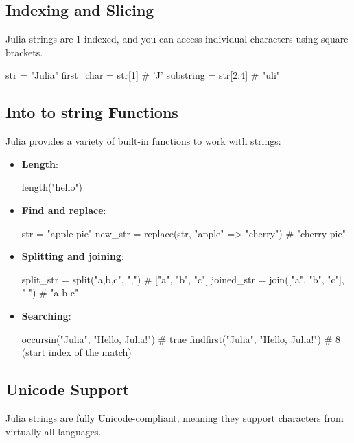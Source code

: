 \documentclass{report}
\begin{document}
    \subsection{Indexing and Slicing}
    \bigbreak \noindent 
    Julia strings are 1-indexed, and you can access individual characters using square brackets.
    \bigbreak \noindent 
    \begin{jlcode}
        str = "Julia"
        first_char = str[1]  # 'J'
        substring = str[2:4]  # "uli"
    \end{jlcode}


    \bigbreak \noindent 
    \subsection{Into to string Functions }
    \bigbreak \noindent 
    Julia provides a variety of built-in functions to work with strings:
    \begin{itemize}
        \item \textbf{Length}:
            \bigbreak \noindent 
            \begin{jlcode}
            length("hello")
            \end{jlcode}
        \item \textbf{Find and replace}:
            \bigbreak \noindent 
            \begin{jlcode}
                str = "apple pie"
                new_str = replace(str, "apple" => "cherry")  # "cherry pie"
            \end{jlcode}
        \item \textbf{Splitting and joining}:
            \bigbreak \noindent 
            \begin{jlcode}
                split_str = split("a,b,c", ",")  # ["a", "b", "c"]
                joined_str = join(["a", "b", "c"], "-")  # "a-b-c"
            \end{jlcode}
        \item \textbf{Searching}:
            \bigbreak \noindent 
            \begin{jlcode}
                occursin("Julia", "Hello, Julia!")  # true
                findfirst("Julia", "Hello, Julia!")  # 8 (start index of the match)
            \end{jlcode}
    \end{itemize}
    \bigbreak \noindent 
    \subsection{Unicode Support}
    \bigbreak \noindent 
    Julia strings are fully Unicode-compliant, meaning they support characters from virtually all languages.
    \bigbreak \noindent 
\end{document}
